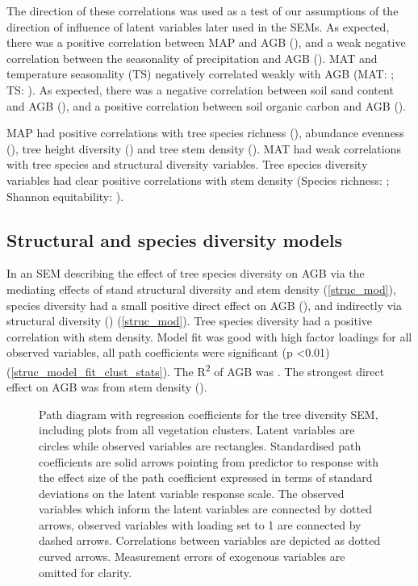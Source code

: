 \documentclass[11pt,a4paper]{article}
\begin{document}
The direction of these correlations was used as a test of our assumptions of the direction of influence of latent variables later used in the SEMs. As expected, there was a positive correlation between MAP and AGB (\ccmb{}), and a weak negative correlation between the seasonality of precipitation and AGB (\ccmcb{}). MAT and temperature seasonality (TS) negatively correlated weakly with AGB (MAT: \cctb{}; TS: \cctcb{}). As expected, there was a negative correlation between soil sand content and AGB (\ccsb{}), and a positive correlation between soil organic carbon and AGB (\ccob{}). 

MAP had positive correlations with tree species richness (\ccms{}), abundance evenness (\ccme{}), tree height diversity (\ccmh{}) and tree stem density (\ccmi{}). MAT had weak correlations with tree species and structural diversity variables. Tree species diversity variables had clear positive correlations with stem density (Species richness: \ccsi{}; Shannon equitability: \ccei{}). 

\subsection{Structural and species diversity models}

In an SEM describing the effect of tree species diversity on AGB via the mediating effects of stand structural diversity and stem density (\autoref{struc_mod}), species diversity had a small positive direct effect on AGB (\strucdb{}), and indirectly via structural diversity (\strucdsb{}) (\autoref{struc_mod}). Tree species diversity had a positive correlation with stem density. Model fit was good with high factor loadings for all observed variables, all path coefficients were significant (p <0.01) (\autoref{struc_model_fit_clust_stats}). The R\textsuperscript{2} of AGB was \strucrsq{}. The strongest direct effect on AGB was from stem density (\strucsib{}).

\begin{figure}[H]
\centering
	
	\caption{Path diagram with regression coefficients for the tree diversity SEM, including plots from all vegetation clusters. Latent variables are circles while observed variables are rectangles. Standardised path coefficients are solid arrows pointing from predictor to response with the effect size of the path coefficient expressed in terms of standard deviations on the latent variable response scale. The observed variables which inform the latent variables are connected by dotted arrows, observed variables with loading set to 1 are connected by dashed arrows. Correlations between variables are depicted as dotted curved arrows. Measurement errors of exogenous variables are omitted for clarity.}
	\label{struc_mod}
\end{figure}
\end{document}
